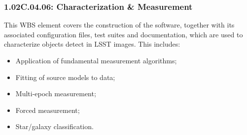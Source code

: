 \subsubsection{1.02C.04.06: Characterization \& Measurement}

This WBS element covers the construction of the software, together with
its associated configuration files, test suites and documentation, which
are used to characterize objects detect in LSST images. This includes:

\begin{itemize}
\item{Application of fundamental measurement algorithms;}
\item{Fitting of source models to data;}
\item{Multi-epoch measurement;}
\item{Forced measurement;}
\item{Star/galaxy classification.}
\end{itemize}
